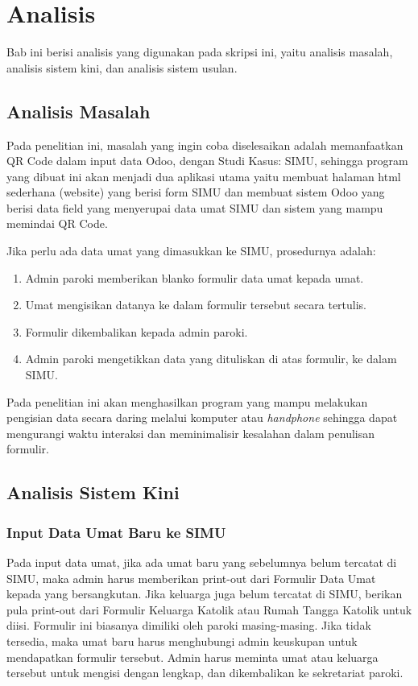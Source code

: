 \chapter{Analisis}
\label{chap:analisis}

Bab ini berisi analisis yang digunakan pada skripsi ini, yaitu analisis masalah, analisis sistem kini, dan analisis sistem usulan.

\section{Analisis Masalah}
\label{sec:masalah}
Pada penelitian ini, masalah yang ingin coba diselesaikan adalah memanfaatkan QR Code dalam input data Odoo, dengan Studi Kasus: SIMU, sehingga program yang dibuat ini akan menjadi dua aplikasi utama yaitu membuat halaman html sederhana (website) yang berisi form SIMU dan membuat sistem Odoo yang berisi data field yang menyerupai data umat SIMU dan sistem yang mampu memindai QR Code.

Jika perlu ada data umat yang dimasukkan ke SIMU, prosedurnya adalah:

\begin{enumerate}
	\item Admin paroki memberikan blanko formulir data umat kepada umat.
	\item Umat mengisikan datanya ke dalam formulir tersebut secara tertulis.
	\item Formulir dikembalikan kepada admin paroki.
	\item Admin paroki mengetikkan data yang dituliskan di atas formulir, ke dalam SIMU.
\end{enumerate}

Pada penelitian ini akan menghasilkan program yang mampu melakukan pengisian data secara daring melalui komputer atau \textit{handphone} sehingga dapat mengurangi waktu interaksi dan meminimalisir kesalahan dalam penulisan formulir.

\section{Analisis Sistem Kini}
\label{sec:analisisSistemKini}

\subsection{Input Data Umat Baru ke SIMU}
\label{sec:inputDataBaru}

Pada input data umat, jika ada umat baru yang sebelumnya belum tercatat di SIMU, maka admin harus memberikan print-out dari Formulir Data Umat kepada yang bersangkutan. Jika keluarga juga belum tercatat di SIMU, berikan pula print-out dari Formulir Keluarga Katolik atau Rumah Tangga Katolik untuk diisi. Formulir ini biasanya dimiliki oleh paroki masing-masing. Jika tidak tersedia, maka umat baru harus menghubungi admin keuskupan untuk mendapatkan formulir tersebut. Admin harus meminta umat atau keluarga tersebut untuk mengisi dengan lengkap, dan dikembalikan ke sekretariat paroki.

